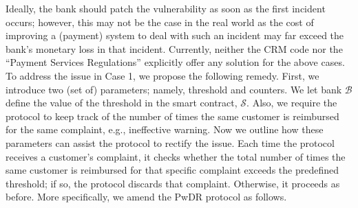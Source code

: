 Ideally, the bank should patch the vulnerability as soon as the first  incident occurs; however, this may not be the case in the real world as the cost of improving a  (payment) system to deal with such an incident may far exceed the  bank's monetary loss in that incident. Currently, neither the CRM code nor the ``Payment Services Regulations'' \cite{Regulations} explicitly offer any solution for the above cases.  To address the issue in Case 1, we propose the following remedy. First, we introduce two (set of) parameters; namely, threshold and counters. We let  bank $\mathcal{B}$  define the value of the threshold  in the smart contract, $\mathcal{S}$. Also, we require the protocol to keep track of the number of times the same customer is reimbursed for the same complaint, e.g., ineffective warning. Now we outline how these parameters can assist the  protocol to rectify the issue. Each time the protocol receives a customer's complaint, it checks whether  the total number of times the same customer is reimbursed for that specific  complaint exceeds the predefined threshold; if so, the protocol discards that complaint. Otherwise, it proceeds as before. More specifically, we amend the PwDR protocol as follows. 

